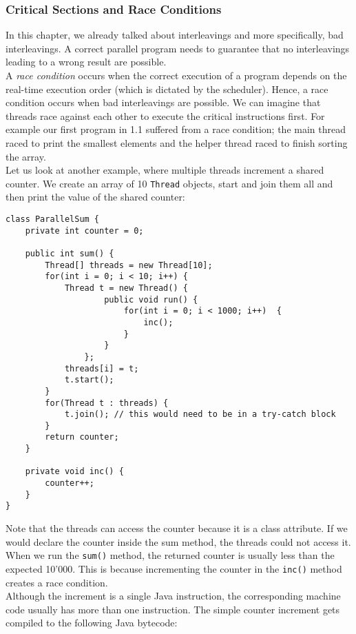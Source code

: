 \documentclass[main.tex]{subfiles}
\begin{document}
\subsubsection{Critical Sections and Race Conditions}
In this chapter, we already talked about interleavings and more specifically, bad interleavings. A correct parallel program needs to guarantee that no interleavings leading to a wrong result are possible.\\[3mm]
A \textit{race condition} occurs when the correct execution of a program depends on the real-time execution order (which is dictated by the scheduler). Hence, a race condition occurs when bad interleavings are possible. We can imagine that threads race against each other to execute the critical instructions first. For example our first program in 1.1 suffered from a race condition; the main thread raced to print the smallest elements and the helper thread raced to finish sorting the array.\\[3mm]
Let us look at another example, where multiple threads increment a shared counter. We create an array of 10 \texttt{Thread} objects, start and join them all and then print the value of the shared counter:
\begin{verbatim}
class ParallelSum {
    private int counter = 0;

    public int sum() {
        Thread[] threads = new Thread[10];
        for(int i = 0; i < 10; i++) {
            Thread t = new Thread() {
                    public void run() {
                        for(int i = 0; i < 1000; i++)  {
                            inc();
                        }
                    }
                };
            threads[i] = t;
            t.start();
        }
        for(Thread t : threads) {
            t.join(); // this would need to be in a try-catch block
        }
        return counter;
    }

    private void inc() {
        counter++;
    }
}
\end{verbatim}
Note that the threads can access the counter because it is a class attribute. If we would declare the counter inside the sum method, the threads could not access it.\\
When we run the \texttt{sum()} method, the returned counter is usually less than the expected 10'000. This is because incrementing the counter in the \texttt{inc()} method creates a race condition.\\[3mm]
Although the increment is a single Java instruction, the corresponding machine code usually has more than one instruction. The simple counter increment gets compiled to the following Java bytecode:
\end{document}
